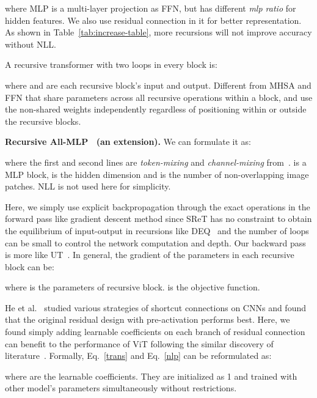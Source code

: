 \documentclass[runningheads]{llncs}
\begin{document}
	where MLP is a multi-layer projection as FFN, but has different {\em mlp ratio} for hidden features. We also use residual connection in it for better representation. As shown in Table~\ref{tab:increase-table}, more recursions will not improve accuracy without NLL.
	
	 A recursive transformer with two loops in every block is:
	
	where  and  are each recursive block's input and output. Different from MHSA and FFN that share parameters across all recursive operations within a block,  and  use the non-shared weights independently regardless of positioning within or outside the recursive blocks. 
	
	\noindent\textbf{Recursive All-MLP~\cite{tolstikhin2021mlpmixer} (an extension).} We can formulate it as:
	
	where the first and second lines are {\em token-mixing} and {\em channel-mixing} from~\cite{tolstikhin2021mlpmixer}.  is a MLP block,  is the hidden dimension and  is the number of non-overlapping image patches. NLL is not used here for simplicity.
	
	 Here, we simply use explicit backpropagation through the exact operations in the forward pass like gradient descent method since SReT has no constraint to obtain the equilibrium of input-output in recursions like DEQ~\cite{bai2019deep} and the number of loops can be small to control the network computation and depth. Our backward pass is more like UT~\cite{dehghani2018universal}. In general, the gradient of the parameters in each recursive block can be:
	
	where  is the parameters of recursive block.  is the objective function.
	
	 He et al.~\cite{he2016identity} studied various strategies of shortcut connections on CNNs and found that the original residual design with pre-activation performs best. Here, we found simply adding learnable coefficients on each branch of residual connection can benefit to the performance of ViT following the similar discovery of literature~\cite{liu-etal-2019-self}. Formally, Eq.~\ref{trans} and Eq.~\ref{nlp} can be reformulated as:
	
	
	where  are the learnable coefficients. They are initialized as 1 and trained with other model's parameters simultaneously without restrictions. 
	
\end{document}
